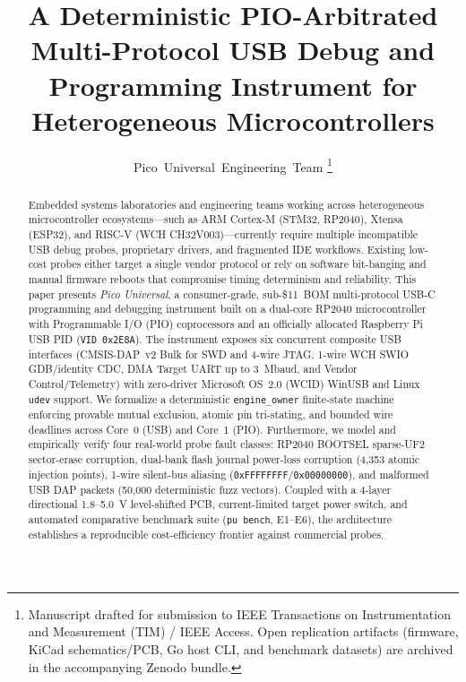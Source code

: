 \documentclass[journal]{IEEEtran}
\begin{document}
\title{A Deterministic PIO-Arbitrated Multi-Protocol USB Debug and Programming Instrument for Heterogeneous Microcontrollers}

\author{Pico~Universal~Engineering~Team%
\thanks{Manuscript drafted for submission to IEEE Transactions on Instrumentation and Measurement (TIM) / IEEE Access. Open replication artifacts (firmware, KiCad schematics/PCB, Go host CLI, and benchmark datasets) are archived in the accompanying Zenodo bundle.}}

\maketitle

\begin{abstract}
Embedded systems laboratories and engineering teams working across heterogeneous microcontroller ecosystems—such as ARM Cortex-M (STM32, RP2040), Xtensa (ESP32), and RISC-V (WCH CH32V003)—currently require multiple incompatible USB debug probes, proprietary drivers, and fragmented IDE workflows. Existing low-cost probes either target a single vendor protocol or rely on software bit-banging and manual firmware reboots that compromise timing determinism and reliability. This paper presents \emph{Pico Universal}, a consumer-grade, sub-\$11~BOM multi-protocol USB-C programming and debugging instrument built on a dual-core RP2040 microcontroller with Programmable I/O (PIO) coprocessors and an officially allocated Raspberry Pi USB PID (\texttt{VID 0x2E8A}). The instrument exposes six concurrent composite USB interfaces (CMSIS-DAP~v2 Bulk for SWD and 4-wire JTAG, 1-wire WCH SWIO GDB/identity CDC, DMA Target UART up to 3~Mbaud, and Vendor Control/Telemetry) with zero-driver Microsoft OS~2.0 (WCID) WinUSB and Linux \texttt{udev} support. We formalize a deterministic \texttt{engine\_owner} finite-state machine enforcing provable mutual exclusion, atomic pin tri-stating, and bounded wire deadlines across Core~0 (USB) and Core~1 (PIO). Furthermore, we model and empirically verify four real-world probe fault classes: RP2040 BOOTSEL sparse-UF2 sector-erase corruption, dual-bank flash journal power-loss corruption (4,353 atomic injection points), 1-wire silent-bus aliasing (\texttt{0xFFFFFFFF}/\texttt{0x00000000}), and malformed USB DAP packets (50,000 deterministic fuzz vectors). Coupled with a 4-layer directional 1.8--5.0~V level-shifted PCB, current-limited target power switch, and automated comparative benchmark suite (\texttt{pu bench}, E1--E6), the architecture establishes a reproducible cost-efficiency frontier against commercial probes.
\end{abstract}
\end{document}
